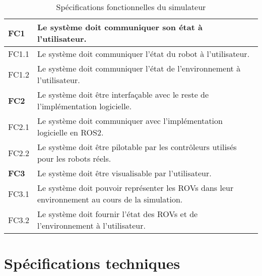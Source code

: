 \begin{table}[!htb]
\begin{adjustbox}{max width=\textwidth}
\begin{tabularx}{\textwidth}{|lX|}
                    \hline \hline
            
                    \cellcolor{orange!40}\textbf{FC1} &\cellcolor{orange!30} Le système doit communiquer son état à l'utilisateur. \\
                    \hline
                    \cellcolor{gray!10}FC1.1& Le système doit communiquer l'état du robot à l'utilisateur. \\
                    \hline
                    \cellcolor{gray!10}FC1.2& Le système doit communiquer l'état de l'environnement à l'utilisateur.\\
                    \hline
            
                    \hline \hline
            
                    \cellcolor{orange!40}\textbf{FC2}&\cellcolor{orange!30} Le système doit être interfaçable avec le reste de l'implémentation logicielle. \\
                    \hline
                    \cellcolor{gray!10}FC2.1& Le système doit communiquer avec l'implémentation logicielle en \gls{ROS2}. \\
                    \hline
                    \cellcolor{gray!10}FC2.2& Le système doit être pilotable par les contrôleurs utilisés pour les robots réels. \\
                    \hline

                    \hline \hline
            
                    \cellcolor{orange!40}\textbf{FC3}&\cellcolor{orange!30} Le système doit être visualisable par l'utilisateur. \\
                    \hline
                    \cellcolor{gray!10}FC3.1& Le système doit pouvoir représenter les \gls{ROV}s dans leur environnement au cours de la simulation. \\
                    \hline
                    \cellcolor{gray!10}FC3.2& Le système doit fournir l'état des \gls{ROV}s et de l'environnement à l'utilisateur.  \\
                    \hline
                \end{tabularx}
            \end{adjustbox}
            \caption{Spécifications fonctionnelles du simulateur}
            \label{table:specs}
        \end{table}    

    \section{Spécifications techniques}

